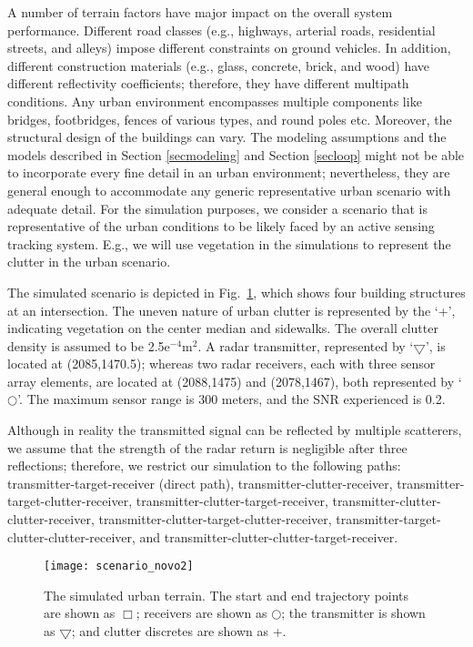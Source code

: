 \documentclass[times]{asjcauth}
\begin{document}
A number of terrain factors have major impact on the overall system performance. Different road classes (e.g., highways, arterial roads, residential streets, and alleys) impose different constraints on ground vehicles. In addition, different construction materials (e.g., glass, concrete, brick, and wood) have different reflectivity coefficients; therefore, they have different multipath conditions. Any urban environment encompasses multiple components like bridges, footbridges, fences of various types, and round poles etc. Moreover, the structural design of the buildings can vary. The modeling assumptions and the models described in Section \ref{secmodeling} and Section \ref{secloop} might not be able to incorporate every fine detail in an urban environment; nevertheless, they are general enough to accommodate any generic representative urban scenario with adequate detail. For the simulation purposes, we consider a scenario that is representative of the urban conditions to be likely faced by an active sensing tracking system. E.g., we will use vegetation in the simulations to represent the clutter in the urban scenario.

The simulated scenario is depicted in Fig.~\ref{figscenario}, which shows four building structures at an intersection. The uneven nature of urban clutter is represented by the `+', indicating vegetation on the center median and sidewalks. The overall clutter density is assumed to be 2.5$\text{e}^{-4}\text{m}^{2}$. A radar transmitter, represented by `$\bigtriangledown$', is located at (2085,1470.5); whereas two radar receivers, each with three sensor array elements, are located at (2088,1475) and (2078,1467), both represented by `$\bigcirc$'. The maximum sensor range is 300 meters, and the SNR experienced is 0.2.

Although in reality the transmitted signal can be reflected by multiple scatterers, we assume that the strength of the radar return is negligible after three reflections; therefore, we restrict our simulation to the following paths: transmitter-target-receiver (direct path), transmitter-clutter-receiver, transmitter-target-clutter-receiver, transmitter-clutter-target-receiver, transmitter-clutter-clutter-receiver, transmitter-clutter-target-clutter-receiver, transmitter-target-clutter-clutter-receiver, and transmitter-clutter-clutter-target-receiver.

\begin{figure}[hbtp]
\centering
\texttt{[image: scenario\_novo2]}
\caption{The simulated urban terrain. The start and end trajectory points are shown as $\Box$; receivers are shown as $\bigcirc$; the transmitter is shown as $\bigtriangledown$; and clutter discretes are shown as +.}\label{figscenario}
\end{figure}
\end{document}
